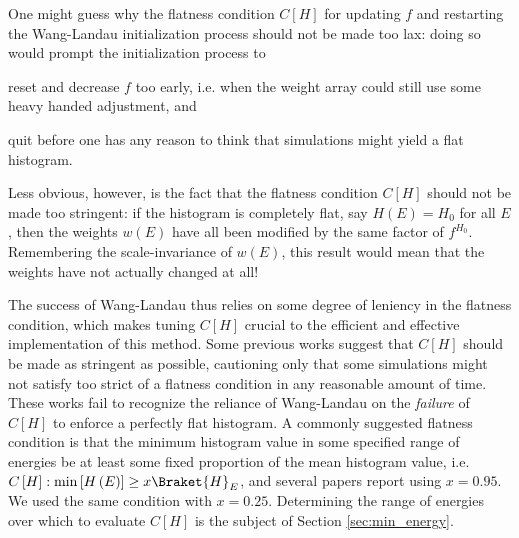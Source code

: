 \documentclass[11pt]{article}
\newcommand{\bk}{\Braket} %
\newcommand{\p}[1]{\left(#1\right)} %
\renewcommand{\sp}[1]{\left[#1\right]} %
\begin{document}
One might guess why the flatness condition $C\sp{H}$ for updating $f$
and restarting the Wang-Landau initialization process should not be
made too lax: doing so would prompt the initialization process to
\begin{enumerate*}[label=\roman*)]
\item reset and decrease $f$ too early, i.e. when the weight array
  could still use some heavy handed adjustment, and
\item quit before one has any reason to think that simulations might
  yield a flat histogram.
\end{enumerate*}
Less obvious, however, is the fact that the flatness condition
$C\sp{H}$ should not be made too stringent: if the histogram is
completely flat, say $H\p{E}=H_0$ for all $E$, then the weights
$w\p{E}$ have all been modified by the same factor of $f^{H_0}$.
Remembering the scale-invariance of $w\p{E}$, this result would mean
that the weights have not actually changed at all!

The success of Wang-Landau thus relies on some degree of leniency in
the flatness condition, which makes tuning $C\sp{H}$ crucial to the
efficient and effective implementation of this method. Some previous
works\cite{wang_landau} suggest that $C\sp{H}$ should be made as
stringent as possible, cautioning only that some simulations might not
satisfy too strict of a flatness condition in any reasonable amount of
time. These works fail to recognize the reliance of Wang-Landau on the
{\it failure} of $C\sp{H}$ to enforce a perfectly flat histogram. A
commonly suggested flatness condition is that the minimum histogram
value in some specified range of energies be at least some fixed
proportion of the mean histogram value, i.e.
$C\sp{H}:\min\sp{H\p{E}}\ge x\bk{H}_E$, and several papers report
using $x=0.95$. We used the same condition with $x=0.25$. Determining
the range of energies over which to evaluate $C\sp{H}$ is the subject
of Section \ref{sec:min_energy}.
\end{document}
